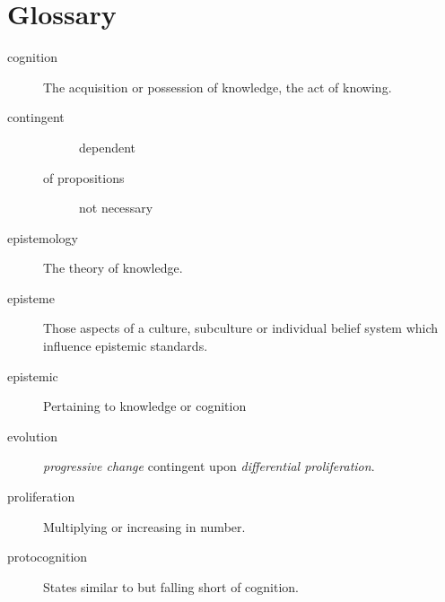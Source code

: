 \chapter{Glossary}\label{Glossary}


\begin{description}
\item[cognition]
  The acquisition or possession of knowledge, the act of knowing.
\item[contingent]
  \begin{description}
  \item[] dependent
  \item[of propositions] not necessary
    \end{description}
\item[epistemology]
  The theory of knowledge.  
\item[episteme]
  Those aspects of a culture, subculture or individual belief system which influence epistemic standards.
\item[epistemic]
  Pertaining to knowledge or cognition

\item[evolution]
  \emph{progressive change} contingent upon \emph{differential proliferation}.
\item[proliferation]
  Multiplying or increasing in number.
\item[protocognition]
    States similar to but falling short of cognition.
\end{description}



